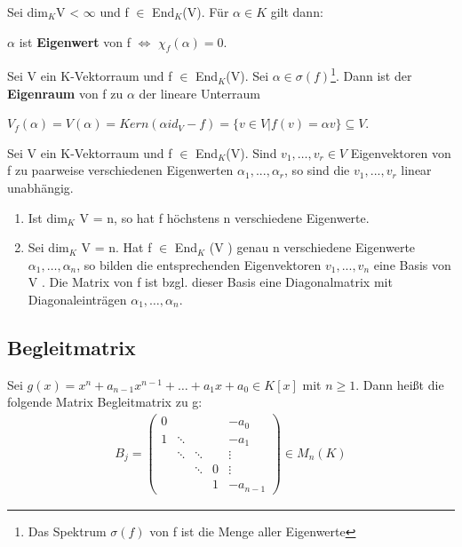 \begin{lemma}
Sei dim$_K$V < $\infty$ und f $\in$ End$_K$(V). Für $\alpha \in K$ gilt dann:
\begin{center}
$\alpha$ ist \textbf{Eigenwert} von f $\Leftrightarrow$ $\chi_f(\alpha) = 0$.
\end{center}
\end{lemma}

\begin{definition}
Sei V ein K-Vektorraum und f $\in$ End$_K$(V).
Sei $\alpha \in \sigma(f)$\footnote{Das Spektrum $\sigma(f)$ von f ist die Menge aller Eigenwerte}. Dann ist der \textbf{Eigenraum} von f zu $\alpha$ der lineare Unterraum
\begin{center}
$V_f(\alpha) = V(\alpha) = Kern(\alpha id_V - f) = \{v \in V | f(v) = \alpha v\} \subseteq V$.
\end{center}
\end{definition}

\begin{lemma}
Sei V ein K-Vektorraum und f $\in$ End$_K$(V). Sind $v_1, …, v_r \in V$ Eigenvektoren von f zu paarweise verschiedenen Eigenwerten $\alpha_1, ..., \alpha_r$, so sind die $v_1, ..., v_r$ linear unabhängig.
\begin{enumerate}
\item Ist dim$_K$ V = n, so hat f höchstens n verschiedene Eigenwerte.
\item Sei dim$_K$ V = n. Hat f $\in$ End$_K$ (V ) genau n verschiedene Eigenwerte $\alpha_1, …, \alpha_n$, so bilden die entsprechenden Eigenvektoren $v_1, ..., v_n$ eine Basis von V . Die Matrix von f ist bzgl. dieser Basis eine Diagonalmatrix mit Diagonaleinträgen $\alpha_1, …, \alpha_n$.
\end{enumerate}
\end{lemma}


\subsection{Begleitmatrix}
\begin{definition}
Sei $g(x) = x^n + a_{n-1}x^{n-1}+\ldots+a_1x + a_0 \in K[x]$ mit $n \geq 1$. Dann heißt die folgende Matrix Begleitmatrix zu g:
\begin{align*}
B_j =
\begin{pmatrix}
0 &        &		&  & -a_0 \\
1 & \ddots &		&  & -a_1 \\
  & \ddots & \ddots	&  & \vdots \\
  &        & \ddots	& 0 & \vdots \\
  &        &		& 1 & -a_{n-1}
\end{pmatrix}
\in M_n(K)
\end{align*} 
\end{definition}

